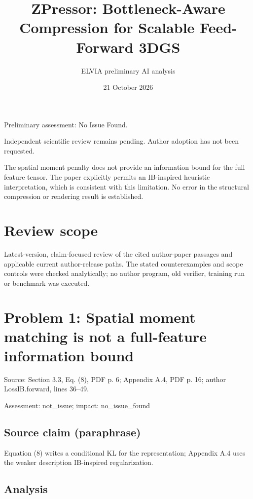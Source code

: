 \documentclass[11pt]{article}
\begin{document}
\title{ZPressor: Bottleneck-Aware Compression for Scalable Feed-Forward 3DGS}

\author{ELVIA preliminary AI analysis}\date{21 October 2026}\maketitle

Preliminary assessment: No Issue Found.\par

Independent scientific review remains pending. Author adoption has not been requested.

The spatial moment penalty does not provide an information bound for the full feature tensor. The paper explicitly permits an IB-inspired heuristic interpretation, which is consistent with this limitation. No error in the structural compression or rendering result is established.

\section*{Review scope}

Latest-version, claim-focused review of the cited author-paper passages and applicable current author-release paths. The stated counterexamples and scope controls were checked analytically; no author program, old verifier, training run or benchmark was executed.

\section*{Problem 1: Spatial moment matching is not a full-feature information bound}

Source: Section 3.3, Eq. (8), PDF p. 6; Appendix A.4, PDF p. 16; author LossIB.forward, lines 36–49.

Assessment: not\_issue; impact: no\_issue\_found

\subsection*{Source claim (paraphrase)}

Equation (8) writes a conditional KL for the representation; Appendix A.4 uses the weaker description IB-inspired regularization.

\subsection*{Analysis}
\end{document}
